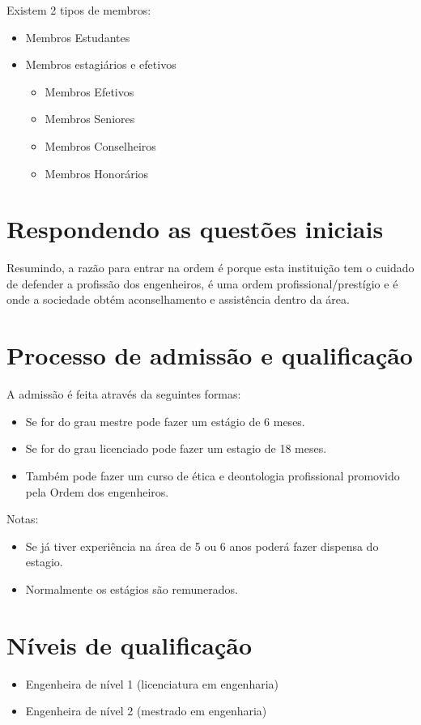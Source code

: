 Existem 2 tipos de membros:

\begin{itemize}
    \item Membros Estudantes
    \item Membros estagiários e efetivos
    \begin{itemize}
        \item Membros Efetivos
        \item Membros Seniores
        \item Membros Conselheiros
        \item Membros Honorários
    \end{itemize}
\end{itemize}

\section{Respondendo as questões iniciais}

Resumindo, a razão para entrar na ordem é porque esta instituição tem o cuidado de defender a profissão dos engenheiros, é uma ordem profissional/prestígio e é onde a sociedade obtém aconselhamento e assistência dentro da área. 

\section{Processo de admissão e qualificação}

A admissão é feita através da seguintes formas:

\begin{itemize}
    \item Se for do grau mestre pode fazer um estágio de 6 meses.
    \item Se for do grau licenciado pode fazer um estagio de 18 meses.
    \item Também pode fazer um curso de ética e deontologia profissional promovido pela Ordem dos engenheiros.
\end{itemize}

Notas:

\begin{itemize}
    \item Se já tiver experiência na área de 5 ou 6 anos poderá fazer dispensa do estagio.
    \item Normalmente os estágios são remunerados.
\end{itemize} 


\section{Níveis de qualificação}
\begin{itemize}
    \item Engenheira de nível 1 (licenciatura em engenharia)
    \item Engenheira de nível 2 (mestrado em engenharia)
\end{itemize}



